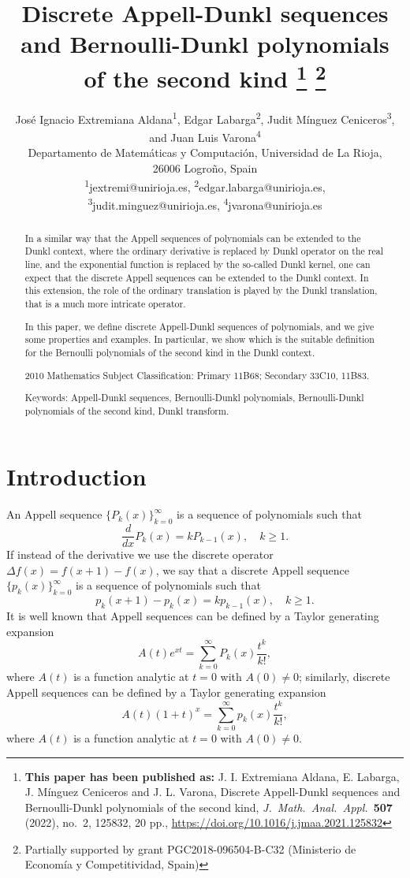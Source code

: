 \documentclass[11pt]{article}
\title{Discrete Appell-Dunkl sequences 
and Bernoulli-Dunkl polynomials of the second kind%
\footnote{\textbf{This paper has been published as:}
J. I. Extremiana Aldana, E. Labarga, J. M\'inguez Ceniceros and J. L. Varona, 
Discrete Appell-Dunkl sequences and Bernoulli-Dunkl polynomials of the second kind,
\textit{J.\ Math.\ Anal.\ Appl.}\ \textbf{507} (2022), no.~2, 125832, 20 pp., 
\url{https://doi.org/10.1016/j.jmaa.2021.125832}}
\footnote{Partially supported by grant PGC2018-096504-B-C32 
(Minis\-te\-rio de Eco\-no\-m\'ia y Com\-pe\-ti\-ti\-vi\-dad, Spain)}}
\author{Jos\'e Ignacio Extremiana Aldana\textsuperscript{1}, 
Edgar Labarga\textsuperscript{2}, 
Judit M\'inguez Ceniceros\textsuperscript{3},\\
and Juan Luis Varona\textsuperscript{4}\\[6pt]
\small Departamento de Matem\'aticas y
Computaci\'on, Universidad de La Rioja,\\[-2pt]
\small 26006 Logro\~no, Spain\\[3pt]
\small \textsuperscript{1}{jextremi@unirioja.es},
\textsuperscript{2}{edgar.labarga@unirioja.es},\\
\small \textsuperscript{3}{judit.minguez@unirioja.es},
\textsuperscript{4}{jvarona@unirioja.es}}
\date{}
\theoremstyle{plain}
\theoremstyle{remark}
\numberwithin{equation}{section} %
\begin{document}

\maketitle

\begin{abstract}
In a similar way that the Appell sequences of polynomials can be extended to the Dunkl context,
where the ordinary derivative is replaced by Dunkl operator on the real line, and the exponential function
is replaced by the so-called Dunkl kernel, one can expect that the discrete Appell sequences can be
extended to the Dunkl context. In this extension, the role of the ordinary translation is played by
the Dunkl translation, that is a much more intricate operator.
 
In this paper, we define discrete Appell-Dunkl sequences of polynomials, and we give some properties 
and examples. In particular, we show which is the suitable definition for the Bernoulli polynomials 
of the second kind in the Dunkl context.

2010 Mathematics Subject Classification: Primary 11B68; Secondary 33C10, 11B83.

Keywords: Appell-Dunkl sequences, Bernoulli-Dunkl polynomials, Bernoulli-Dunkl polynomials of the second kind, Dunkl transform.
\end{abstract}

\section{Introduction}

An Appell sequence $\{P_k(x)\}_{k=0}^{\infty}$ is a sequence of polynomials such that 
\begin{equation}
\label{eq:A}
  \frac{d}{dx} P_k(x) = k P_{k-1}(x), \quad k \ge 1.
\end{equation}
If instead of the derivative we use the discrete operator $\Delta f(x) = f(x+1) - f(x)$, we say that a discrete Appell sequence $\{p_k(x)\}_{k=0}^{\infty}$ is a sequence of polynomials such that 
\begin{equation}
\label{eq:Adiscrete}
  p_k(x+1) - p_k(x) = k p_{k-1}(x), \quad k \ge 1.
\end{equation}
It is well known that Appell sequences can be defined by a Taylor generating expansion
\begin{equation}
\label{eq:As}
  A(t) e^{xt} = \sum_{k=0}^{\infty} P_k(x) \frac{t^k}{k!},
\end{equation}
where $A(t)$ is a function analytic at $t=0$ with $A(0) \ne 0$; 
similarly, discrete Appell sequences can be defined by a Taylor generating expansion
\begin{equation}
\label{eq:dAs}
  A(t)(1+t)^x = \sum_{k=0}^{\infty} p_k(x) \frac{t^k}{k!},
\end{equation}
where $A(t)$ is a function analytic at $t=0$ with $A(0) \ne 0$. 
\end{document}
